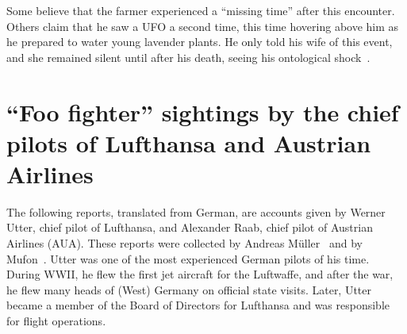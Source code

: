 Some believe that the farmer experienced a ``missing time'' after this encounter. Others claim that he saw a UFO a second time, this time hovering above him as he prepared to water young lavender plants. He only told his wife of this event, and she remained silent until after his death, seeing his ontological shock~\cite{ExoMagazinTV2020Aug}.

\section{``Foo fighter'' sightings by the chief pilots of Lufthansa and Austrian Airlines}

\label{2023-UFO-chapter-History--1953-2016-scpla}


The following reports, translated from German, are accounts given by Werner Utter,
chief pilot of Lufthansa, and
Alexander Raab, chief pilot of Austrian Airlines (AUA).
These reports were collected by Andreas M\"uller~\cite{Muller2021Nov} and by Mufon~\cite{ExoMagazinTV2013Feb}. Utter was one of the most experienced German pilots of his time. During WWII, he flew the first jet aircraft for the Luftwaffe, and after the war, he flew many heads of (West) Germany on official state visits. Later, Utter became a member of the Board of Directors for Lufthansa and was responsible for flight operations.

